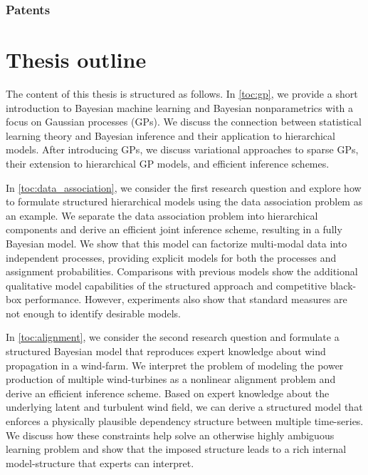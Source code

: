 \subsubsection{Patents}


\section{Thesis outline}
The content of this thesis is structured as follows.
In \cref{toc:gp}, we provide a short introduction to Bayesian machine learning and Bayesian nonparametrics with a focus on Gaussian processes (GPs).
We discuss the connection between statistical learning theory and Bayesian inference and their application to hierarchical models.
After introducing GPs, we discuss variational approaches to sparse GPs, their extension to hierarchical GP models, and efficient inference schemes.

In \cref{toc:data_association}, we consider the first research question and explore how to formulate structured hierarchical models using the data association problem as an example.
We separate the data association problem into hierarchical components and derive an efficient joint inference scheme, resulting in a fully Bayesian model.
We show that this model can factorize multi-modal data into independent processes, providing explicit models for both the processes and assignment probabilities.
Comparisons with previous models show the additional qualitative model capabilities of the structured approach and competitive black-box performance.
However, experiments also show that standard measures are not enough to identify desirable models.

In \cref{toc:alignment}, we consider the second research question and formulate a structured Bayesian model that reproduces expert knowledge about wind propagation in a wind-farm.
We interpret the problem of modeling the power production of multiple wind-turbines as a nonlinear alignment problem and derive an efficient inference scheme.
Based on expert knowledge about the underlying latent and turbulent wind field, we can derive a structured model that enforces a physically plausible dependency structure between multiple time-series.
We discuss how these constraints help solve an otherwise highly ambiguous learning problem and show that the imposed structure leads to a rich internal model-structure that experts can interpret.

